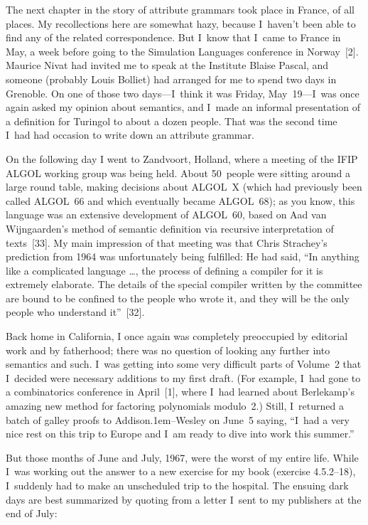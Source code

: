 The next chapter in the story of attribute grammars took place in
France, of all places. My recollections here are somewhat hazy,
because I~haven't been able to find any of the related correspondence.
But I~know that I~came to France in May, a week before going to the 
Simulation Languages conference in Norway~[2].
Maurice Nivat had invited me to speak at the Institute Blaise Pascal,
and someone (probably Louis Bolliet) had arranged for me to spend two
days in Grenoble. On one of those two days---I~think it was Friday,
May~19---I~was once again asked my opinion about semantics, and I~made
an informal presentation of a definition for Turingol to about a dozen
people. That was the second time I~had had occasion to write down an
attribute grammar.

On the following day I went to Zandvoort, Holland, where a meeting of
the IFIP
{\ninerm ALGOL} working group was being held. About 50~people were 
sitting around a large round table,
making
decisions about 
{\ninerm ALGOL~X} (which had previously been called {\ninerm ALGOL}~66 and
which eventually became {\ninerm ALGOL}~68); 
as you know, this language
was an extensive development
of 
{\ninerm ALGOL}~60, based on Aad van Wijngaarden's method of semantic
definition via recursive interpretation of texts~[33].
My main impression of that meeting was that Chris Strachey's
prediction from 1964 was unfortunately being fulfilled: He had said, 
``In anything like a complicated language \dots , the process of
defining a compiler for it is extremely elaborate. The details of the
special compiler written by the committee are bound to be confined to
the people who wrote it, and they will be the only people who
understand it''~[32].

Back home in California, I once again was completely preoccupied by
editorial work and by fatherhood; there was no question of looking any
further into semantics and such. I~was getting into some very
difficult parts of Volume~2 that I~decided were necessary additions to
my first draft. (For example, I~had gone to a combinatorics conference
in April~[1],
where I~had learned about Berlekamp's amazing new method for factoring
polynomials modulo~2.)
Still, I~returned a batch of galley proofs to 
Addison\kern.1em--Wesley on June~5
saying, ``I~had a very nice rest on this trip to Europe and I~am
ready to dive into work this summer.''

But those months of June and July, 1967, were the worst of
my entire life. While I~was working out the answer to a new exercise
for my book (exercise 4.5.2--18), I~suddenly had to make an
unscheduled trip to the hospital. The ensuing dark days are best
summarized by quoting from a letter I~sent to my publishers at the end
of July:

